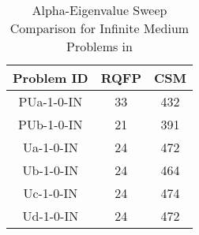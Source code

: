 \begin{table}[H]
    \centering
    \caption{Reference Eigenvalues for Infinite Medium Problems in \cite{sood2003analytical}}
\label{table:InfMed}
    \scalebox{1.00}{
    \begin{tabular}{*3c}
        \toprule
        & \multicolumn{2}{c}{Eigenvalues} \\
        \cmidrule(lr){2-3}
        Problem & Reference & Reference \\    
        ID   & $k_{\infty}$  & $\alpha_{\infty}$ (s$^{-1}$) \\
        \midrule
        PUa-1-0-IN &  2.612903 & 0.1632 \\
        PUb-1-0-IN & 2.290323 & 0.1306 \\
	Ua-1-0-IN &  2.25 & 0.1265 \\
	Ub-1-0-IN & 2.330917 & 0.1347 \\
	Uc-1-0-IN & 2.256083 & 0.1271 \\
	Ud-1-0-IN & 2.232667 & 0.1247 \\
        \bottomrule
    \end{tabular}
    }
\end{table}

\begin{table}[]
    \centering
    \caption{Alpha-Eigenvalue Sweep Comparison for Infinite Medium Problems in \cite{sood2003analytical}}
    \label{table:alph}
    \centering
    \begin{tabular}{*3c}
        Problem ID & RQFP & CSM \\    
        \midrule
        PUa-1-0-IN & 33 & 432 \\
        PUb-1-0-IN & 21 & 391   \\
	Ua-1-0-IN & 24 & 472\\
	Ub-1-0-IN & 24 & 464 \\
	Uc-1-0-IN & 24 & 474 \\
	Ud-1-0-IN & 24 & 472\\
        \bottomrule
    \end{tabular}
\end{table}

